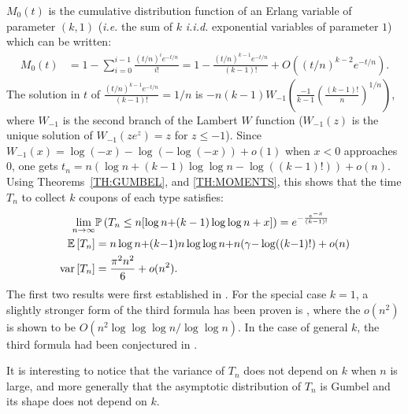 \documentclass{aptpub}
\newcommand\expect[1]{\mathchoice{\bexpect{#1}}{\sexpect{#1}}{\sexpect{#1}}{\sexpect{#1}}}
\newcommand\bexpect[1]{\mathbb{E}\left[#1\right]}
\newcommand\sexpect[1]{\mathbb{E}[#1]}
\newcommand\variance[1]{\mathrm{var}\left[#1\right]}
\newcommand\proba[1]{\mathchoice{\bproba{#1}}{\sproba{#1}}{\sproba{#1}}{\sproba{#1}}}
\newcommand\bproba[1]{\mathbb{P}\left(#1\right)}
\newcommand\sproba[1]{\mathbb{P}(#1)}
\begin{document}
$M_0(t)$ is the cumulative distribution function of an Erlang variable
of parameter $(k,1)$ (\emph{i.e.} the sum of $k$ \emph{i.i.d.}
exponential variables of parameter $1$) which can be written:
\begin{align*}
  M_0(t)&=1-\sum_{i=0}^{i-1}\frac{(t/n)^ie^{-t/n}}{i!}
          =1-\frac{(t/n)^{k-1}e^{-t/n}}{(k-1)!}+O((t/n)^{k-2}e^{-t/n}).
\end{align*}
The solution in $t$ of $\frac{(t/n)^{k-1}e^{-t/n}}{(k-1)!} = 1/n$ is
$-n(k-1)W_{-1}\left(\frac{-1}{k-1}\left(\frac{(k-1)!}{n}\right)^{1/n}
\right)$,
where $W_{-1}$ is the second branch of the Lambert $W$
function ($W_{-1}(z)$ is the unique solution of
$W_{-1}(ze^z)=z$ for $z \leq -1$).  Since
$W_{-1}(x) = \log(-x) - \log(-\log(-x)) + o(1)$ when $x<0$ approaches
$0$, one gets
$t_n=n (\log n + (k-1) \log\log n - \log((k-1)!))  + o(n)$.  Using
Theorems~\ref{TH:GUMBEL}, and \ref{TH:MOMENTS}, this shows that the
time $T_n$ to collect $k$ coupons of each type satisfies:
\begin{align*}
  \lim_{n\to\infty} & \proba{T_n\le n[\log n {+} (k-1)\log \log n 
    +x]}=e^{-\frac{e^{-x}}{(k-1)!}} \\
  \expect{T_n}&= n\log n {+} (k{-}1)n\log \log n 
    {+} n(\gamma{-}\log((k{-}1)!) +o(n) \\
 \variance{T_n} &= \frac{\pi^2n^2}{6 } + o(n^2).
\end{align*}
The first two results were first established in \cite{Erdos}. For the
special case $k=1$, a slightly stronger form of the third formula has
been proven is \cite{BRAYTON196331}, where the $o(n^2)$ is shown to be
$O(n^2\log\log\log n / \log\log n)$. In the case of general $k$, the
third formula had been conjectured in \cite{doumas2014coupon}.

It is interesting to 
notice  that the variance of $T_n$ does not depend on $k$ when $n$ is large, and more
generally  that the asymptotic distribution of $T_n$
is Gumbel and its shape does not depend on $k$.
\end{document}
